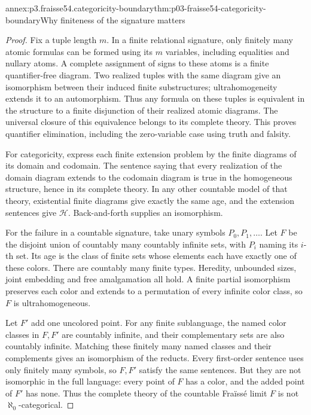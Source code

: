 \begin{annexitem}{annex:p3.fraisse54.categoricity-boundary}{thm:p03-fraisse54-categoricity-boundary}{Why finiteness of the signature matters}
\begin{proof}
Fix a tuple length \(m\). In a finite relational signature, only finitely
many atomic formulas can be formed using its \(m\) variables, including
equalities and nullary atoms. A complete assignment of signs to these
atoms is a finite quantifier-free diagram. Two realized tuples with the
same diagram give an isomorphism between their induced finite substructures;
ultrahomogeneity extends it to an automorphism. Thus any formula on these
tuples is equivalent in the structure to a finite disjunction of their
realized atomic diagrams. The universal closure of this equivalence belongs
to its complete theory. This proves quantifier elimination, including the
zero-variable case using truth and falsity.

For categoricity, express each finite extension problem by the finite
diagrams of its domain and codomain. The sentence saying that every
realization of the domain diagram extends to the codomain diagram is true
in the homogeneous structure, hence in its complete theory. In any other
countable model of that theory, existential finite diagrams give exactly
the same age, and the extension sentences give \(\mathcal H\).
Back-and-forth supplies an isomorphism.

For the failure in a countable signature, take unary symbols
\(P_0,P_1,\ldots\). Let \(F\) be the disjoint union of countably many
countably infinite sets, with \(P_i\) naming its \(i\)-th set. Its age
is the class of finite sets whose elements each have exactly one of these
colors. There are countably many finite types. Heredity, unbounded sizes,
joint embedding and free amalgamation all hold. A finite partial
isomorphism preserves each color and extends to a permutation of every
infinite color class, so \(F\) is ultrahomogeneous.

Let \(F'\) add one uncolored point. For any finite sublanguage, the named
color classes in \(F,F'\) are countably infinite, and their complementary
sets are also countably infinite. Matching these finitely many named classes
and their complements gives an isomorphism of the reducts. Every
first-order sentence uses only finitely many symbols, so \(F,F'\) satisfy
the same sentences. But they are not isomorphic in the full language:
every point of \(F\) has a color, and the added point of \(F'\) has none.
Thus the complete theory of the countable Fra\"iss\'e limit \(F\) is not
\(\aleph_0\)-categorical.
\end{proof}
\end{annexitem}

